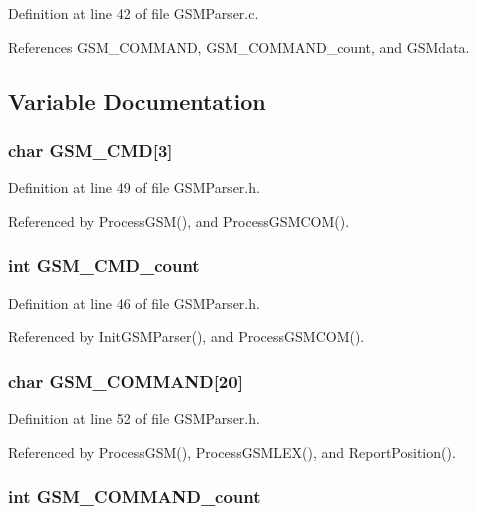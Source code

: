 Definition at line 42 of file GSMParser.c.

References GSM\_\-COMMAND, GSM\_\-COMMAND\_\-count, and GSMdata.

\subsection{Variable Documentation}
\subsubsection{\setlength{\rightskip}{0pt plus 5cm}char {\bf GSM\_\-CMD}[3]}\label{_g_s_m_parser_8h_b3ec6d5497360de17a80beb8f4923042}




Definition at line 49 of file GSMParser.h.

Referenced by ProcessGSM(), and ProcessGSMCOM().
\subsubsection{\setlength{\rightskip}{0pt plus 5cm}int {\bf GSM\_\-CMD\_\-count}}\label{_g_s_m_parser_8h_ca8b821143959d6ebfdfa61e13cb7a25}




Definition at line 46 of file GSMParser.h.

Referenced by InitGSMParser(), and ProcessGSMCOM().
\subsubsection{\setlength{\rightskip}{0pt plus 5cm}char {\bf GSM\_\-COMMAND}[20]}\label{_g_s_m_parser_8h_bcf54e7f11a287a83fcbe1af22c347fa}




Definition at line 52 of file GSMParser.h.

Referenced by ProcessGSM(), ProcessGSMLEX(), and ReportPosition().
\subsubsection{\setlength{\rightskip}{0pt plus 5cm}int {\bf GSM\_\-COMMAND\_\-count}}\label{_g_s_m_parser_8h_92fcf08ac60650fc12f6f1ecfde1d3c5}




